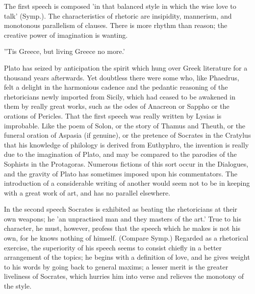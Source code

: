 \documentclass[11pt,letter]{article}
\begin{document}
\par  The first speech is composed 'in that balanced style in which the wise love to talk' (Symp.). The characteristics of rhetoric are insipidity, mannerism, and monotonous parallelism of clauses. There is more rhythm than reason; the creative power of imagination is wanting.

\par  ''Tis Greece, but living Greece no more.'

\par  Plato has seized by anticipation the spirit which hung over Greek literature for a thousand years afterwards. Yet doubtless there were some who, like Phaedrus, felt a delight in the harmonious cadence and the pedantic reasoning of the rhetoricians newly imported from Sicily, which had ceased to be awakened in them by really great works, such as the odes of Anacreon or Sappho or the orations of Pericles. That the first speech was really written by Lysias is improbable. Like the poem of Solon, or the story of Thamus and Theuth, or the funeral oration of Aspasia (if genuine), or the pretence of Socrates in the Cratylus that his knowledge of philology is derived from Euthyphro, the invention is really due to the imagination of Plato, and may be compared to the parodies of the Sophists in the Protagoras. Numerous fictions of this sort occur in the Dialogues, and the gravity of Plato has sometimes imposed upon his commentators. The introduction of a considerable writing of another would seem not to be in keeping with a great work of art, and has no parallel elsewhere.

\par  In the second speech Socrates is exhibited as beating the rhetoricians at their own weapons; he 'an unpractised man and they masters of the art.' True to his character, he must, however, profess that the speech which he makes is not his own, for he knows nothing of himself. (Compare Symp.) Regarded as a rhetorical exercise, the superiority of his speech seems to consist chiefly in a better arrangement of the topics; he begins with a definition of love, and he gives weight to his words by going back to general maxims; a lesser merit is the greater liveliness of Socrates, which hurries him into verse and relieves the monotony of the style.
\end{document}
